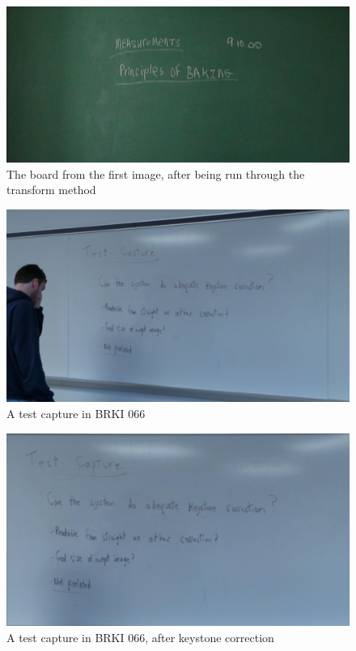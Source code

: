 \documentclass[]{article}
\begin{document}
\begin{figure}[H]
\centering
\includegraphics[scale=0.5]{images/classroom_out}
\caption{The board from the first image, after being run through the transform method}
\end{figure}		
	
\begin{figure}[H]
\centering
\includegraphics[scale=0.2]{images/keystone_before1}
\caption{A test capture in BRKI 066}
\end{figure}	

\begin{figure}[H]
\centering
\includegraphics[scale=0.2]{images/keystone_after1}
\caption{A test capture in BRKI 066, after keystone correction}
\end{figure}	
	
\end{document}
